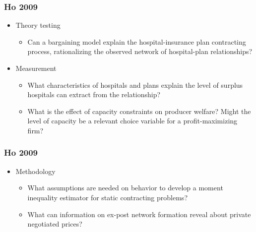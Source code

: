 \documentclass[notes=show]{beamer}
\begin{document}
\begin{frame}
\frametitle{Ho 2009}

\begin{itemize}
	\item Theory testing
         \begin{itemize}
	\item Can a bargaining model explain the hospital-insurance plan contracting process, rationalizing the observed network of hospital-plan relationships? 	\end{itemize}
	\item Measurement
	\begin{itemize}
	\item What characteristics of hospitals and plans explain the level of surplus hospitals can extract from the relationship?
	\item What is the effect of capacity constraints on producer welfare?  Might the level of capacity be a relevant choice variable for a profit-maximizing firm?
	\end{itemize}
\end{itemize}
\end{frame}


\begin{frame}
\frametitle{Ho 2009}

\begin{itemize}
	\item Methodology
	\begin{itemize}
	\item What assumptions are needed on behavior to develop a moment inequality estimator for static contracting problems?
	\item What can information on ex-post network formation reveal about private negotiated prices?
	\end{itemize}
\end{itemize}
\end{frame}

\end{document}

